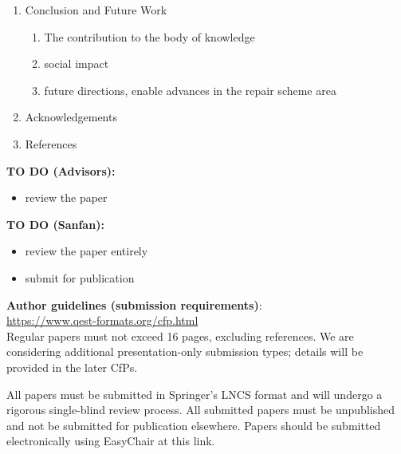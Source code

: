 \begin{enumerate}
\begin{enumerate}
          \item IEEE-14 Failure Cases
          \begin{enumerate}
            \item experiment 1
            \item experiment 2
            \item Experiment 3
            \end{enumerate}
        \item Discussion of results
        \end{enumerate}
  \item Conclusion and Future Work 
    \begin{enumerate}
          \item The contribution to the body of knowledge 
          \item social impact 
          \item future directions, enable advances in the repair scheme area
        \end{enumerate}
  \item Acknowledgements 
  \item References
\end{enumerate}

\vspace{2ex}

\textbf{TO DO (Advisors):}
\begin{itemize}
    \item review the paper
\end{itemize}

\textbf{TO DO (Sanfan):}
\begin{itemize}
    \item review the paper entirely
    \item submit for publication 
\end{itemize}

\textbf{Author guidelines (submission requirements)}: \\ 
\url{https://www.qest-formats.org/cfp.html}\\
Regular papers must not exceed 16 pages, excluding references.
We are considering additional presentation-only submission types; details will be provided in the later CfPs.

All papers must be submitted in Springer’s LNCS format and will undergo a rigorous single-blind review process. All submitted papers must be unpublished and not be submitted for publication elsewhere. Papers should be submitted electronically using EasyChair at this link.

